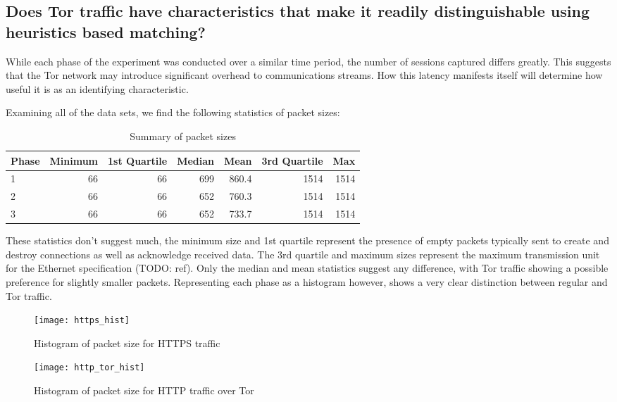 \subsection{Does Tor traffic have characteristics that make it readily
distinguishable using heuristics based matching?}

While each phase of the experiment was conducted over a similar time
period, the number of sessions captured differs greatly. This suggests that
the Tor network may introduce significant overhead to communications
streams. How this latency manifests itself will determine how useful it is
as an identifying characteristic.

Examining all of the data sets, we find the following statistics of packet
sizes:

\begin{table}[H]
  \begin{tabular}{lrrrrrr}
    \toprule
    Phase & Minimum & 1st Quartile & Median & Mean & 3rd Quartile & Max \\
    \midrule
    1 & 66 & 66 & 699 & 860.4 & 1514 & 1514\\
    2 & 66 & 66 & 652 & 760.3 & 1514 & 1514\\
    3 & 66 & 66 & 652 & 733.7 & 1514 & 1514\\
    \bottomrule
  \end{tabular}
  \caption{Summary of packet sizes}
  \label{table:packet_size_summary}
\end{table}

These statistics don't suggest much, the minimum size and 1st quartile
represent the presence of empty packets typically sent to create and destroy
connections as well as acknowledge received data. The 3rd quartile and maximum
sizes represent the maximum transmission unit for the Ethernet specification
(TODO: ref). Only the median and mean statistics suggest any difference, with
Tor traffic showing a possible preference for slightly smaller packets.
Representing each phase as a histogram however, shows a very clear distinction
between regular and Tor traffic.

\begin{figure}[H]
  \centering\texttt{[image: https\_hist]}
  \caption{Histogram of packet size for HTTPS traffic}
  \label{https_hist}
\end{figure}

\begin{figure}[H]
  \centering\texttt{[image: http\_tor\_hist]}
  \caption{Histogram of packet size for HTTP traffic over Tor}
  \label{http_tor_hist}
\end{figure}

